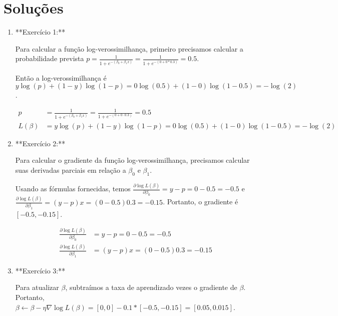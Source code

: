 \documentclass[12pt,a4paper, brazil]{article}
\begin{document}
\section{Soluções}

\begin{enumerate}

  \item **Exercício 1:** 
   
Para calcular a função log-verossimilhança, primeiro precisamos calcular a probabilidade prevista $p = \frac{1}{1+e^{-(\beta_0 + \beta_1x)}} = \frac{1}{1+e^{-(0 + 0*0.3)}} = 0.5$. 

Então a log-verossimilhança é $y \log(p) + (1 - y) \log(1 - p) = 0 \log(0.5) + (1 - 0) \log(1 - 0.5) = -\log(2)$.



\begin{equation*}
\begin{split}
p &= \frac{1}{1+e^{-(\beta_0 + \beta_1x)}} = \frac{1}{1+e^{-(0 + 0 \cdot 0.3)}} = 0.5 \\
L(\beta) &= y \log(p) + (1 - y) \log(1 - p) = 0 \log(0.5) + (1 - 0) \log(1 - 0.5) = -\log(2)
\end{split}
\end{equation*}


\item  **Exercício 2:**

Para calcular o gradiente da função log-verossimilhança, precisamos calcular suas derivadas parciais em relação a $\beta_0$ e $\beta_1$. 

Usando as fórmulas fornecidas, temos $\frac{\partial \log L(\beta)}{\partial \beta_0} = y - p = 0 - 0.5 = -0.5$ e $\frac{\partial \log L(\beta)}{\partial \beta_1} = (y - p)x = (0 - 0.5)0.3 = -0.15$. Portanto, o gradiente é $[-0.5, -0.15]$.


\begin{equation*}
\begin{split}
\frac{\partial \log L(\beta)}{\partial \beta_0} &= y - p = 0 - 0.5 = -0.5 \\
\frac{\partial \log L(\beta)}{\partial \beta_1} &= (y - p)x = (0 - 0.5)0.3 = -0.15
\end{split}
\end{equation*}


\item  **Exercício 3:**

Para atualizar $\beta$, subtraímos a taxa de aprendizado vezes o gradiente de $\beta$. Portanto, $\beta \leftarrow \beta - \eta \nabla \log L(\beta) = [0, 0] - 0.1 * [-0.5, -0.15] = [0.05, 0.015]$.



\end{enumerate}
\end{document}
